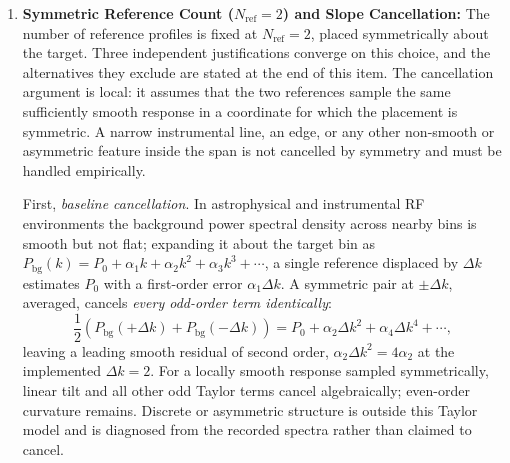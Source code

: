 \begin{enumerate}
\begin{enumerate}
    \end{enumerate}
    These four constraints concern the exactness and efficiency of the downstream arithmetic rather than detection statistics: sensitivity is set by the frame length and the coherent transform, while $K$ is selected so that the implementation can be verified at the bit level.

    \item \textbf{Symmetric Reference Count ($N_{\text{ref}} = 2$) and Slope Cancellation:} The number of reference profiles is fixed at $N_{\text{ref}} = 2$, placed symmetrically about the target. Three independent justifications converge on this choice, and the alternatives they exclude are stated at the end of this item.  The cancellation argument is local: it assumes that the two references sample the same sufficiently smooth response in a coordinate for which the placement is symmetric.  A narrow instrumental line, an edge, or any other non-smooth or asymmetric feature inside the span is not cancelled by symmetry and must be handled empirically.

    First, \emph{baseline cancellation}. In astrophysical and instrumental RF environments the background power spectral density across nearby bins is smooth but not flat; expanding it about the target bin as $P_{\text{bg}}(k) = P_0 + \alpha_1 k + \alpha_2 k^2 + \alpha_3 k^3 + \cdots$, a single reference displaced by $\Delta k$ estimates $P_0$ with a first-order error $\alpha_1 \Delta k$. A symmetric pair at $\pm \Delta k$, averaged, cancels \emph{every odd-order term identically}:
    \begin{equation}
    \frac{1}{2}\left( P_{\text{bg}}(+\Delta k) + P_{\text{bg}}(-\Delta k) \right) = P_0 + \alpha_2 \Delta k^2 + \alpha_4 \Delta k^4 + \cdots,
    \end{equation}
    leaving a leading smooth residual of second order, $\alpha_2 \Delta k^2 = 4\alpha_2$ at the implemented $\Delta k = 2$.  For a locally smooth response sampled symmetrically, linear tilt and all other odd Taylor terms cancel algebraically; even-order curvature remains.  Discrete or asymmetric structure is outside this Taylor model and is diagnosed from the recorded spectra rather than claimed to cancel.


\end{enumerate}
